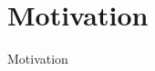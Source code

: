\section{Motivation}

\begin{frame}
        \centering
        \huge Motivation
        \note{
            }
\end{frame}